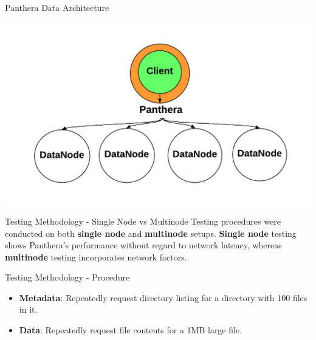 \documentclass[final]{beamer} %
\begin{document}
\begin{frame}
\begin{columns}[t]
\begin{column}{0.32\textwidth}
      
      \begin{block}{Panthera Data Architecture}
      \centerline{\includegraphics[scale=1.2]{assets/panthera_data_architecture.pdf}}
     \end{block}


      
	\begin{block}{Testing Methodology - Single Node vs Multinode}
	Testing procedures were conducted on both \textbf{single node} and \textbf{multinode} setups.\textbf{ Single node} testing shows Panthera's performance without regard to network latency, whereas \textbf{multinode} testing incorporates network factors.
	\end{block}
	
	\begin{block}{Testing Methodology - Procedure}
	\begin{itemize}
		\item \textbf{Metadata}: Repeatedly request directory listing for a directory with 100 files in it.
		\item \textbf{Data}: Repeatedly request file contents for a 1MB large file.
	\end{itemize}
	\end{block}


\end{column}
\end{columns}
\end{frame}
\end{document}
